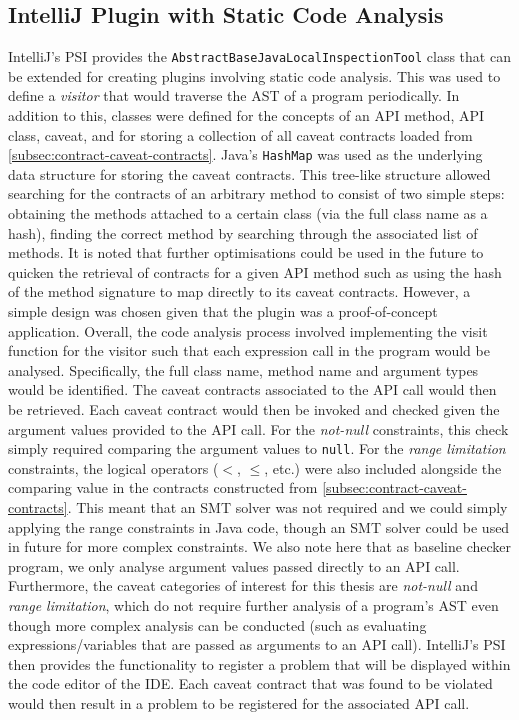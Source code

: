 \subsection{IntelliJ Plugin with Static Code Analysis}
\label{subsec:contract-plugin}
IntelliJ's PSI provides the \lstinline{AbstractBaseJavaLocalInspectionTool} class that can be extended for creating plugins involving static code analysis. This was used to define a \textit{visitor} that would traverse the AST of a program periodically. In addition to this, classes were defined for the concepts of an API method, API class, caveat, and for storing a collection of all caveat contracts loaded from \ref{subsec:contract-caveat-contracts}. Java's \lstinline{HashMap} was used as the underlying data structure for storing the caveat contracts. This tree-like structure allowed searching for the contracts of an arbitrary method to consist of two simple steps: obtaining the methods attached to a certain class (via the full class name as a hash), finding the correct method by searching through the associated list of methods. It is noted that further optimisations could be used in the future to quicken the retrieval of contracts for a given API method such as using the hash of the method signature to map directly to its caveat contracts. However, a simple design was chosen given that the plugin was a proof-of-concept application. Overall, the code analysis process involved implementing the visit function for the visitor such that each expression call in the program would be analysed. Specifically, the full class name, method name and argument types would be identified. The caveat contracts associated to the API call would then be retrieved. Each caveat contract would then be invoked and checked given the argument values provided to the API call. For the \textit{not-null} constraints, this check simply required comparing the argument values to \lstinline{null}. For the \textit{range limitation} constraints, the logical operators ($<$, $\leq$, etc.) were also included alongside the comparing value in the contracts constructed from \ref{subsec:contract-caveat-contracts}. This meant that an SMT solver was not required and we could simply applying the range constraints in Java code, though an SMT solver could be used in future for more complex constraints. We also note here that as baseline checker program, we only analyse argument values passed directly to an API call. Furthermore, the caveat categories of interest for this thesis are \textit{not-null} and \textit{range limitation}, which do not require further analysis of a program's AST even though more complex analysis can be conducted (such as evaluating expressions/variables that are passed as arguments to an API call). IntelliJ's PSI then provides the functionality to register a problem that will be displayed within the code editor of the IDE. Each caveat contract that was found to be violated would then result in a problem to be registered for the associated API call.

